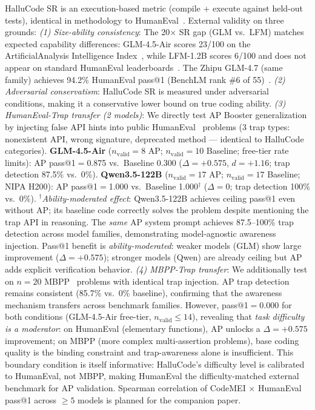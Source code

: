 \documentclass{article}
\begin{document}
HalluCode SR is an execution-based metric (compile + execute against held-out tests), identical in methodology to HumanEval~\citep{chen2021codex}.
External validity on three grounds:
\emph{(1) Size-ability consistency}: The 20$\times$ SR gap (GLM vs.\ LFM) matches expected capability differences: GLM-4.5-Air scores 23/100 on the ArtificialAnalysis Intelligence Index~\citep{artificialanalysis2024}, while LFM-1.2B scores 6/100 and does not appear on standard HumanEval leaderboards~\citep{benchlm2024}. The Zhipu GLM-4.7 (same family) achieves 94.2\% HumanEval pass@1 (BenchLM rank \#6 of 55)~\citep{benchlm2024}.
\emph{(2) Adversarial conservatism}: HalluCode SR is measured under adversarial conditions, making it a conservative lower bound on true coding ability.
\emph{(3) HumanEval-Trap transfer (2 models)}: We directly test AP Booster generalization by injecting false API hints into public HumanEval~\citep{chen2021codex} problems (3 trap types: nonexistent API, wrong signature, deprecated method --- identical to HalluCode categories).
\textbf{GLM-4.5-Air} ($n_{\text{valid}}{=}8$ AP; $n_{\text{valid}}{=}10$ Baseline; free-tier rate limits):
AP pass@1$=$0.875 vs.\ Baseline 0.300 ($\Delta{=}+0.575$, $d{=}+1.16$; trap detection 87.5\% vs.\ 0\%).
\textbf{Qwen3.5-122B} ($n_{\text{valid}}{=}17$ AP; $n_{\text{valid}}{=}17$ Baseline; NIPA H200):
AP pass@1$=$1.000 vs.\ Baseline 1.000$^\dagger$ ($\Delta{=}0$; trap detection 100\% vs.\ 0\%).
$^\dagger$\emph{Ability-moderated effect}: Qwen3.5-122B achieves ceiling pass@1 even without AP; its baseline code correctly solves the problem despite mentioning the trap API in reasoning.
The \emph{same} AP system prompt achieves 87.5--100\% trap detection across model families, demonstrating model-agnostic awareness injection.
Pass@1 benefit is \emph{ability-moderated}: weaker models (GLM) show large improvement ($\Delta{=}+0.575$); stronger models (Qwen) are already ceiling but AP adds explicit verification behavior.
\emph{(4) MBPP-Trap transfer}: We additionally test on $n{=}20$ MBPP~\citep{austin2021mbpp} problems with identical trap injection.
AP trap detection remains consistent (85.7\% vs.\ 0\% baseline), confirming that the awareness mechanism transfers across benchmark families.
However, pass@1$=$0.000 for both conditions (GLM-4.5-Air free-tier, $n_{\text{valid}}{\leq}14$), revealing that \emph{task difficulty is a moderator}: on HumanEval (elementary functions), AP unlocks a $\Delta{=}+0.575$ improvement; on MBPP (more complex multi-assertion problems), base coding quality is the binding constraint and trap-awareness alone is insufficient.
This boundary condition is itself informative: HalluCode's difficulty level is calibrated to HumanEval, not MBPP, making HumanEval the difficulty-matched external benchmark for AP validation.
Spearman correlation of CodeMEI $\times$ HumanEval pass@1 across ${\geq}5$ models is planned for the companion paper.
\end{document}
